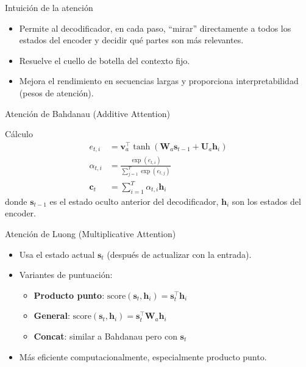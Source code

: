 \documentclass[aspectratio=169, 10pt, xcolor=table]{beamer}
\begin{document}
\begin{frame}{Intuición de la atención}
    \begin{itemize}
        \item Permite al decodificador, en cada paso, ``mirar'' directamente a todos los estados del encoder y decidir qué partes son más relevantes.
        \item Resuelve el cuello de botella del contexto fijo.
        \item Mejora el rendimiento en secuencias largas y proporciona interpretabilidad (pesos de atención).
    \end{itemize}
\end{frame}

\begin{frame}{Atención de Bahdanau (Additive Attention)}
    \begin{block}{Cálculo}
        \begin{align*}
            e_{t,i} &= \mathbf{v}_a^\top \tanh(\mathbf{W}_a \mathbf{s}_{t-1} + \mathbf{U}_a \mathbf{h}_i) \\
            \alpha_{t,i} &= \frac{\exp(e_{t,i})}{\sum_{j=1}^T \exp(e_{t,j})} \\
            \mathbf{c}_t &= \sum_{i=1}^T \alpha_{t,i} \mathbf{h}_i
        \end{align*}
        donde $\mathbf{s}_{t-1}$ es el estado oculto anterior del decodificador, $\mathbf{h}_i$ son los estados del encoder.
    \end{block}
\end{frame}

\begin{frame}{Atención de Luong (Multiplicative Attention)}
    \begin{itemize}
        \item Usa el estado actual $\mathbf{s}_t$ (después de actualizar con la entrada).
        \item Variantes de puntuación:
        \begin{itemize}
            \item \textbf{Producto punto}: $\text{score}(\mathbf{s}_t, \mathbf{h}_i) = \mathbf{s}_t^\top \mathbf{h}_i$
            \item \textbf{General}: $\text{score}(\mathbf{s}_t, \mathbf{h}_i) = \mathbf{s}_t^\top \mathbf{W}_a \mathbf{h}_i$
            \item \textbf{Concat}: similar a Bahdanau pero con $\mathbf{s}_t$
        \end{itemize}
        \item Más eficiente computacionalmente, especialmente producto punto.
    \end{itemize}
\end{frame}
\end{document}
